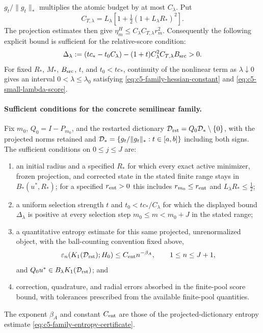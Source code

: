 \documentclass[11pt]{article}
\theoremstyle{remark}
\begin{document}
$g_t/\|g_t\|_*$ multiplies the atomic budget by at most $C_\lambda$.
Put
\begin{equation}
 C_{T,\lambda}=L_\lambda\left[1+\tfrac12(1+L_\lambda R_*)^2\right].
 \label{eq:c5-family-transfer-constant}
\end{equation}
The projection estimates then give
$\eta_m^H\leq C_\lambda C_{T,\lambda}r_m^2$.  Consequently the
following explicit bound is sufficient for the relative-score condition:
\begin{equation}
 \Delta_\lambda:=(tc_*-t_0C_\lambda)
 -(1+t)C_\lambda^2C_{T,\lambda}B_{\rm src}>0.
 \label{eq:c5-small-lambda-score}
\end{equation}
For fixed \(R_*\), \(M_*\), \(B_{\rm src}\), \(t\), and \(t_0<tc_*\), continuity of the nonlinear term as \(\lambda\downarrow0\) gives an interval \(0<\lambda\le\lambda_0\) satisfying \eqref{eq:c5-family-hessian-constant} and \eqref{eq:c5-small-lambda-score}.

\paragraph{Sufficient conditions for the concrete semilinear family.}
Fix \(m_0\), \(Q_0=I-P_{m_0}\), and the restarted dictionary \(\mathcal D_{\rm rst}=Q_0\mathcal D_*\setminus\{0\}\), with the projected norms retained and \(\mathcal D_*=\{g_t/\|g_t\|_*:t\in[a,b]\}\) including both signs. The sufficient conditions on \(0\le j\le J\) are:
\begin{enumerate}[label=(A\arabic*)]
  \item an initial radius and a specified $R_*$ for which every exact active
  minimizer, frozen projection, and corrected state in the stated finite range stays in
  $B_*(u^*,R_*)$; for a specified $r_{\rm ent}>0$ this includes
  $r_{m_0}\leq r_{\rm ent}$ and
  $L_\lambda R_*\leq\tfrac12$;
  \item a uniform selection strength $t$ and $t_0<tc_*/C_\lambda$ for
  which the displayed bound $\Delta_\lambda$ is positive at every
  selection step $m_0\leq m<m_0+J$ in the stated range;
  \item a quantitative entropy estimate for this same projected,
  unrenormalized object, with the ball-counting convention fixed above,
  \begin{equation}
    \varepsilon_n\!\left(K_1(\mathcal D_{\rm rst});H_0\right)
       \leq C_{\rm ent}n^{-\beta_A},
       \qquad 1\leq n\leq J+1,
    \label{eq:c5-family-entropy-certificate}
  \end{equation}
  and $Q_0u^*\in B_\lambda K_1(\mathcal D_{\rm rst})$; and
  \item correction, quadrature, and radial errors absorbed in the
  finite-pool score bound, with tolerances prescribed from the available finite-pool quantities.
\end{enumerate}
The exponent \(\beta_A\) and constant \(C_{\rm ent}\) are those of the projected-dictionary entropy estimate \eqref{eq:c5-family-entropy-certificate}.
\end{document}
